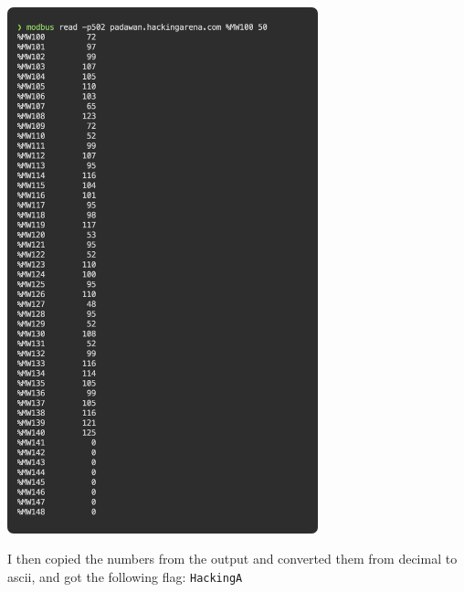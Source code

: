 \begin{center}
    \includegraphics[width=9cm]{img/Get in touch with services/Dark energy/Screenshot 2023-11-10 at 10.38.21.png}
\end{center}

I then copied the numbers from the output and converted them from decimal to ascii, and got the following flag:
\texttt{HackingA}